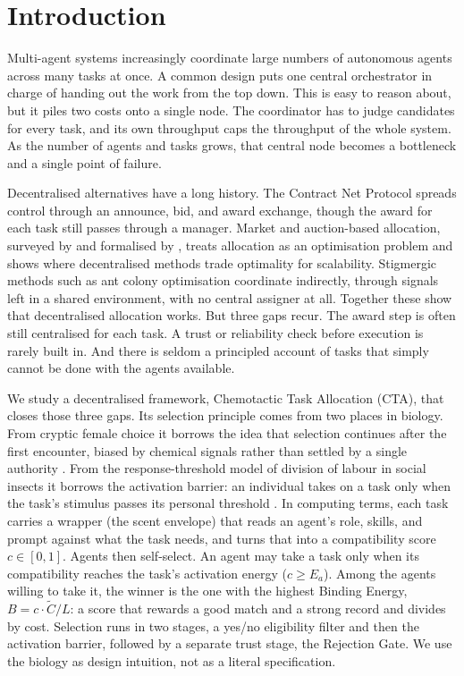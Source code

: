\documentclass[11pt]{article}
\begin{document}
\section{Introduction}

Multi-agent systems increasingly coordinate large numbers of autonomous agents across many tasks at once. A common design puts one central orchestrator in charge of handing out the work from the top down. This is easy to reason about, but it piles two costs onto a single node. The coordinator has to judge candidates for every task, and its own throughput caps the throughput of the whole system. As the number of agents and tasks grows, that central node becomes a bottleneck and a single point of failure.

Decentralised alternatives have a long history. The Contract Net Protocol \citep{smith1980contractnet} spreads control through an announce, bid, and award exchange, though the award for each task still passes through a manager. Market and auction-based allocation, surveyed by \citet{dias2006market} and formalised by \citet{gerkey2004taxonomy}, treats allocation as an optimisation problem and shows where decentralised methods trade optimality for scalability. Stigmergic methods such as ant colony optimisation \citep{dorigo1996ant} coordinate indirectly, through signals left in a shared environment, with no central assigner at all. Together these show that decentralised allocation works. But three gaps recur. The award step is often still centralised for each task. A trust or reliability check before execution is rarely built in. And there is seldom a principled account of tasks that simply cannot be done with the agents available.

We study a decentralised framework, Chemotactic Task Allocation (CTA), that closes those three gaps. Its selection principle comes from two places in biology. From cryptic female choice it borrows the idea that selection continues after the first encounter, biased by chemical signals rather than settled by a single authority \citep{fitzpatrick2020cryptic}. From the response-threshold model of division of labour in social insects it borrows the activation barrier: an individual takes on a task only when the task's stimulus passes its personal threshold \citep{bonabeau1996threshold}. In computing terms, each task carries a wrapper (the scent envelope) that reads an agent's role, skills, and prompt against what the task needs, and turns that into a compatibility score $c\in[0,1]$. Agents then self-select. An agent may take a task only when its compatibility reaches the task's activation energy ($c\geq E_a$). Among the agents willing to take it, the winner is the one with the highest Binding Energy, $B=c\cdot\tilde{C}/L$: a score that rewards a good match and a strong record and divides by cost. Selection runs in two stages, a yes/no eligibility filter and then the activation barrier, followed by a separate trust stage, the Rejection Gate. We use the biology as design intuition, not as a literal specification.
\end{document}
